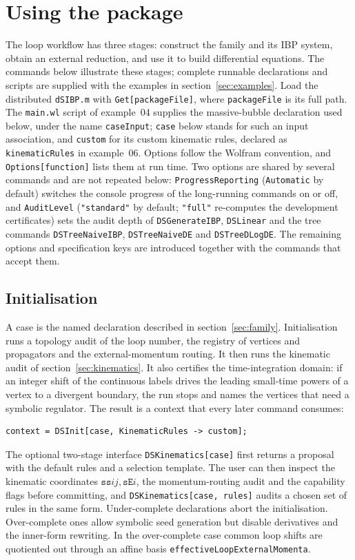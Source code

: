 \documentclass[11pt,a4paper]{article}
\begin{document}
\section{Using the package}
\label{sec:using}

The loop workflow has three stages: construct the family and its IBP system, obtain an external
reduction, and use it to build differential equations. The commands below illustrate these
stages; complete runnable declarations and scripts are supplied with the examples in
section~\ref{sec:examples}. Load the distributed \texttt{dSIBP.m} with
\texttt{Get[packageFile]}, where \texttt{packageFile} is its full path. The
\texttt{main.wl} script of example~04 supplies the massive-bubble declaration used below, under the
name \texttt{caseInput}; \texttt{case} below stands for such an input association, and
\texttt{custom} for its custom kinematic rules, declared as \texttt{kinematicRules} in example~06.
Options follow the Wolfram convention, and \texttt{Options[function]} lists them at run time.
Two options are shared by several commands and are not repeated below: \texttt{ProgressReporting}
(\texttt{Automatic} by default) switches the console progress of the long-running commands on or
off, and \texttt{AuditLevel} (\texttt{"standard"} by default; \texttt{"full"} re-computes the
development certificates) sets the audit depth of \texttt{DSGenerateIBP}, \texttt{DSLinear} and the
tree commands \texttt{DSTreeNaiveIBP}, \texttt{DSTreeNaiveDE} and \texttt{DSTreeDLogDE}. The
remaining options and specification keys are introduced together with the commands that accept
them.

\subsection{Initialisation}
\label{sec:init}

A case is the named declaration described in section~\ref{sec:family}. Initialisation runs a
topology audit of the loop number,
the registry of vertices and propagators and the external-momentum routing. It then runs the
kinematic audit of
section~\ref{sec:kinematics}. It also certifies the time-integration domain: if an integer shift of
the continuous labels drives the leading small-time powers of a vertex to a divergent boundary, the
run stops and names the vertices that need a symbolic regulator. The result is a context that every
later command consumes:
\begin{verbatim}
context = DSInit[case, KinematicRules -> custom];
\end{verbatim}
The optional two-stage interface \texttt{DSKinematics[case]} first returns a proposal with the
default rules and a selection template. The user can then inspect the kinematic coordinates
$\texttt{ss}ij,\texttt{sE}i$, the momentum-routing audit and the capability flags before committing,
and \texttt{DSKinematics[case, rules]} audits a chosen set of rules in the same form.
Under-complete declarations abort the initialisation. Over-complete ones allow symbolic seed
generation but disable derivatives and the inner-form rewriting. In the over-complete case common
loop shifts are quotiented out through an affine basis \texttt{effectiveLoopExternalMomenta}.
\end{document}
